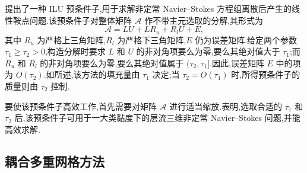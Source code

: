 \begin{note}
\label{note:chapter9-ilu-fill-in}
\textcite{Konshin2015}提出了一种 ILU 预条件子,用于求解非定常 Navier--Stokes 方程组离散后产生的线性鞍点问题.该预条件子对整体矩阵 $\mathcal A$ 作不带主元选取的分解,其形式为
\[
 \mathcal A=LU+L R_u+R_l U+E,
\]
其中 $R_u$ 为严格上三角矩阵,$R_l$ 为严格下三角矩阵,$E$ 仍为误差矩阵.给定两个参数 $\tau_1\ge\tau_2>0$,构造分解时要求 $L$ 和 $U$ 的非对角项要么为零,要么其绝对值大于 $\tau_1$;而 $R_u$ 和 $R_l$ 的非对角项要么为零,要么其绝对值属于 $(\tau_2,\tau_1]$.因此,误差矩阵 $E$ 中的项为 $O(\tau_2)$.如\textcite{Konshin2015}所述,该方法的填充量由 $\tau_1$ 决定;当 $\tau_2=O(\tau_1)$ 时,所得预条件子的质量则由 $\tau_2$ 控制.

要使该预条件子高效工作,首先需要对矩阵 $\mathcal A$ 进行适当缩放.\textcite{Konshin2015}表明,选取合适的 $\tau_1$ 和 $\tau_2$ 后,该预条件子可用于一大类黏度下的层流三维非定常 Navier--Stokes 问题,并能高效求解.
\end{note}


\subsection{耦合多重网格方法}
\label{subsec:chapter9-coupled-multigrid}\label{subsec:multigrid-method}
\label{subsec:chapter9-iterative-solvers}

